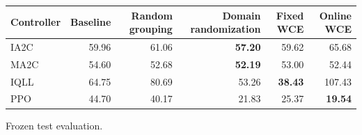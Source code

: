 \begin{tabular}{lrrrrr}
\hline
Controller & Baseline & Random grouping & Domain randomization & Fixed WCE & Online WCE \\
\hline
IA2C & 59.96 & 61.06 & \textbf{57.20} & 59.62 & 65.68 \\
MA2C & 54.60 & 52.68 & \textbf{52.19} & 53.00 & 52.44 \\
IQLL & 64.75 & 80.69 & 53.26 & \textbf{38.43} & 107.43 \\
PPO & 44.70 & 40.17 & 21.83 & 25.37 & \textbf{19.54} \\
\hline
\end{tabular}
Frozen test evaluation.
